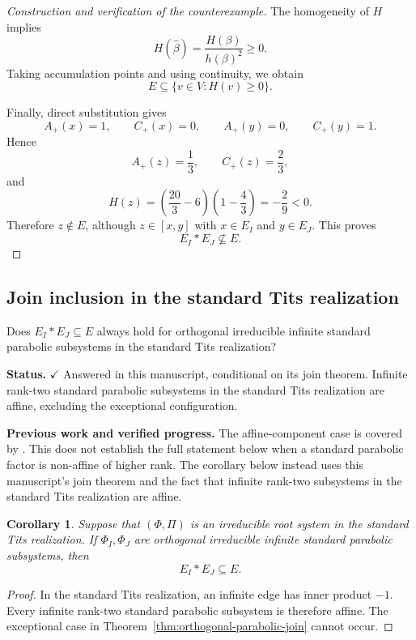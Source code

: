 \documentclass[11pt,reqno]{amsart}
\theoremstyle{plain}
\newtheorem{corollary}[theorem]{Corollary}
\theoremstyle{definition}
\theoremstyle{remark}
\numberwithin{equation}{section}
\begin{document}
\begin{proof}[Construction and verification of the counterexample]
The homogeneity of $H$ implies
\[
H(\widehat\beta)=\frac{H(\beta)}{h(\beta)^2}\ge0.
\]
Taking accumulation points and using continuity, we obtain
\[
E\subseteq\{v\in V:H(v)\ge0\}.
\]

Finally, direct substitution gives
\[
A_+(x)=1,\qquad C_+(x)=0,
\qquad
A_+(y)=0,\qquad C_+(y)=1.
\]
Hence
\[
A_+(z)=\frac13,\qquad C_+(z)=\frac23,
\]
and
\[
H(z)
=
\left(\frac{20}{3}-6\right)
\left(1-\frac43\right)
=
-\frac29<0.
\]
Therefore $z\notin E$, although $z\in[x,y]$ with
$x\in E_I$ and $y\in E_J$. This proves
\[
E_I*E_J\not\subseteq E.
\]
\end{proof}

\subsection{Join inclusion in the standard Tits realization}

Does $E_I*E_J\subseteq E$ always hold for orthogonal irreducible
infinite standard parabolic subsystems in the standard Tits realization?


\par\medskip
\noindent\textbf{Status.} \(\checkmark\) Answered in this manuscript, conditional on its join theorem. Infinite rank-two standard parabolic subsystems in the standard Tits realization are affine, excluding the exceptional configuration.

\par\medskip
\noindent\textbf{Previous work and verified progress.}
The affine-component case is covered by
\cite[Proposition~5.30]{FRX2026}. This does not establish the full statement
below when a standard parabolic factor is non-affine of higher rank.
The corollary below instead uses this manuscript's join theorem and
the fact that infinite rank-two subsystems in the standard Tits
realization are affine.

\begin{corollary}\label{cor:standard-tits-join}
Suppose that $(\Phi,\Pi)$ is an irreducible root system in the
standard Tits realization. If $\Phi_I,\Phi_J$ are orthogonal
irreducible infinite standard parabolic subsystems, then
\[
E_I*E_J\subseteq E.
\]
\end{corollary}

\begin{proof}
In the standard Tits realization, an infinite edge has inner
product $-1$. Every infinite rank-two standard parabolic
subsystem is therefore affine. The exceptional case in
Theorem~\ref{thm:orthogonal-parabolic-join} cannot occur.
\end{proof}
\end{document}
